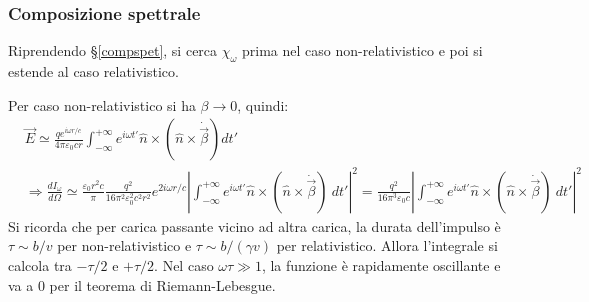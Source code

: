 \documentclass[10pt, a4paper]{scrartcl}
\numberwithin{equation}{subsection}
\theoremstyle{style1}
\begin{document}
\subsubsection{Composizione spettrale}

Riprendendo \S\ref{compspet}, si cerca $\chi _\omega$ prima nel caso non-relativistico e poi si estende al caso relativistico. 

Per caso non-relativistico si ha $\beta \to 0$, quindi:
\[
	\begin{split}
&\vec{E}\simeq \frac{q e^{i\omega r / c} }{4\pi \varepsilon _0 c r}\int_{-\infty} ^{+\infty} e^{i\omega t'} \hat{n}\times (\hat{n}\times \dot{\vec{\beta }}) dt' \\
&\Rightarrow \frac{d I_\omega}{d \Omega }  \simeq \frac{\varepsilon _0 r^2 c}{\pi} \frac{q^2}{16 \pi ^2 \varepsilon _0^2c^2 r^2} e^{2i\omega r /c }  \left\lvert \int_{-\infty} ^{+\infty} e^{i\omega t' } \hat{n}\times (\hat{n}\times \dot{\vec{\beta }}) \ dt'  \right\rvert ^2 = \frac{q^2}{16 \pi^3 \varepsilon _0 c} \left\lvert \int_{-\infty} ^{+\infty} e^{i\omega t' } \hat{n}\times (\hat{n}\times \dot{\vec{\beta }}) \ dt' \right\rvert ^2
	\end{split}
\] 
Si ricorda che per carica passante vicino ad altra carica, la durata dell'impulso \`e $\tau  \sim b / v$ per non-relativistico e $\tau  \sim b / (\gamma v)$ per relativistico. Allora l'integrale si calcola tra $- \tau  / 2$ e $ + \tau  / 2$. Nel caso $\omega \tau  \gg 1 $, la funzione \`e rapidamente oscillante e va a $0$ per il teorema di Riemann-Lebesgue.
\end{document}
